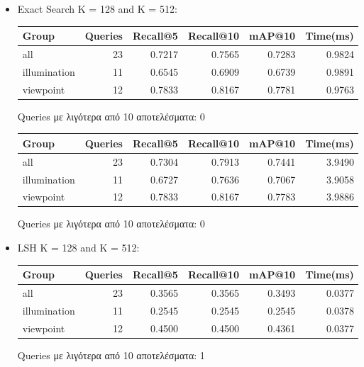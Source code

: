 \documentclass [conference]{IEEEtran}
\begin{document}
\begin{itemize}
    \item Exact Search K = 128 and K = 512:
    \begin{table}[H]
    \centering
    \small
    \setlength{\tabcolsep}{3pt}
    \begin{tabular}{l r r r r r}
    \hline
    \textbf{Group} & \textbf{Queries} & \textbf{Recall@5} & \textbf{Recall@10} & \textbf{mAP@10} & \textbf{Time(ms)} \\
    \hline
    all & 23 & 0.7217 & 0.7565 & 0.7283 & 0.9824 \\
    illumination & 11 & 0.6545 & 0.6909 & 0.6739 & 0.9891 \\
    viewpoint & 12 & 0.7833 & 0.8167 & 0.7781 & 0.9763 \\
    \hline
    \end{tabular}
    \par\smallskip
    \footnotesize Queries με λιγότερα από 10 αποτελέσματα: 0
    \end{table}
    

    \begin{table}[H]
    \centering
    \small
    \setlength{\tabcolsep}{3pt}
    \begin{tabular}{l r r r r r}
    \hline
    \textbf{Group} & \textbf{Queries} & \textbf{Recall@5} & \textbf{Recall@10} & \textbf{mAP@10} & \textbf{Time(ms)} \\
    \hline
    all & 23 & 0.7304 & 0.7913 & 0.7441 & 3.9490 \\
    illumination & 11 & 0.6727 & 0.7636 & 0.7067 & 3.9058 \\
    viewpoint & 12 & 0.7833 & 0.8167 & 0.7783 & 3.9886 \\
    \hline
    \end{tabular}
    \par\smallskip
    \footnotesize Queries με λιγότερα από 10 αποτελέσματα: 0
    \end{table}
    
    
    \item LSH K = 128 and K = 512:
    \begin{table}[H]
    \centering
    \small
    \setlength{\tabcolsep}{3pt}
    \begin{tabular}{l r r r r r}
    \hline
    \textbf{Group} & \textbf{Queries} & \textbf{Recall@5} & \textbf{Recall@10} & \textbf{mAP@10} & \textbf{Time(ms)} \\
    \hline
    all & 23 & 0.3565 & 0.3565 & 0.3493 & 0.0377 \\
    illumination & 11 & 0.2545 & 0.2545 & 0.2545 & 0.0378 \\
    viewpoint & 12 & 0.4500 & 0.4500 & 0.4361 & 0.0377 \\
    \hline
    \end{tabular}
    \par\smallskip
    \footnotesize Queries με λιγότερα από 10 αποτελέσματα: 1
    \end{table}
    

\end{itemize}
\end{document}
